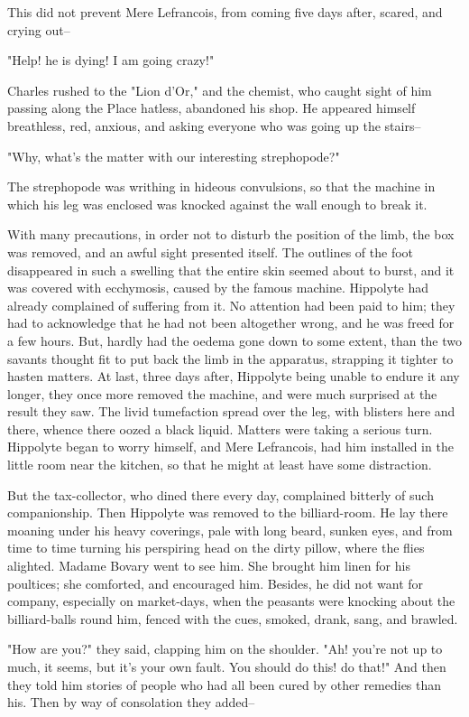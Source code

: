 \documentclass[11pt,twocolumn]{ltugboat}
\begin{document}
This did not prevent Mere Lefrancois, from coming five days after,
scared, and crying out--

"Help! he is dying! I am going crazy!"

Charles rushed to the "Lion d'Or," and the chemist, who caught sight
of him passing along the Place hatless, abandoned his shop. He appeared
himself breathless, red, anxious, and asking everyone who was going up
the stairs--

"Why, what's the matter with our interesting strephopode?"

The strephopode was writhing in hideous convulsions, so that the machine
in which his leg was enclosed was knocked against the wall enough to
break it.

With many precautions, in order not to disturb the position of the limb,
the box was removed, and an awful sight presented itself. The outlines
of the foot disappeared in such a swelling that the entire skin seemed
about to burst, and it was covered with ecchymosis, caused by the famous
machine. Hippolyte had already complained of suffering from it. No
attention had been paid to him; they had to acknowledge that he had not
been altogether wrong, and he was freed for a few hours. But, hardly had
the oedema gone down to some extent, than the two savants thought fit
to put back the limb in the apparatus, strapping it tighter to hasten
matters. At last, three days after, Hippolyte being unable to endure it
any longer, they once more removed the machine, and were much surprised
at the result they saw. The livid tumefaction spread over the leg, with
blisters here and there, whence there oozed a black liquid. Matters
were taking a serious turn. Hippolyte began to worry himself, and Mere
Lefrancois, had him installed in the little room near the kitchen, so
that he might at least have some distraction.

But the tax-collector, who dined there every day, complained bitterly of
such companionship. Then Hippolyte was removed to the billiard-room.
He lay there moaning under his heavy coverings, pale with long beard,
sunken eyes, and from time to time turning his perspiring head on the
dirty pillow, where the flies alighted. Madame Bovary went to see him.
She brought him linen for his poultices; she comforted, and encouraged
him. Besides, he did not want for company, especially on market-days,
when the peasants were knocking about the billiard-balls round him,
fenced with the cues, smoked, drank, sang, and brawled.

"How are you?" they said, clapping him on the shoulder. "Ah! you're not
up to much, it seems, but it's your own fault. You should do this! do
that!" And then they told him stories of people who had all been cured
by other remedies than his. Then by way of consolation they added--
\end{document}
